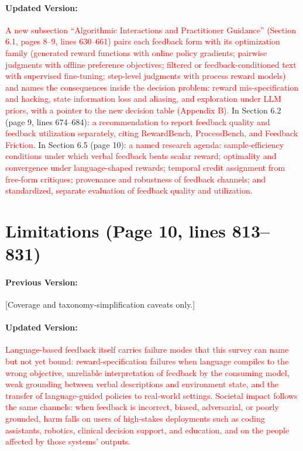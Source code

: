 \documentclass[11pt]{article}
\newcommand{\red}[1]{\textcolor{red}{#1}}
\begin{document}
\paragraph{Updated Version:} \red{A new subsection ``Algorithmic Interactions and Practitioner Guidance'' (Section 6.1, pages 8--9, lines 630--661) pairs each feedback form with its optimization family (generated reward functions with online policy gradients; pairwise judgments with offline preference objectives; filtered or feedback-conditioned text with supervised fine-tuning; step-level judgments with process reward models) and names the consequences inside the decision problem: reward mis-specification and hacking, state information loss and aliasing, and exploration under LLM priors, with a pointer to the new decision table (Appendix B).} In Section 6.2 (page 9, lines 674--684): \red{a recommendation to report feedback quality and feedback utilization separately, citing RewardBench, ProcessBench, and Feedback Friction.} In Section 6.5 (page 10): \red{a named research agenda: sample-efficiency conditions under which verbal feedback beats scalar reward; optimality and convergence under language-shaped rewards; temporal credit assignment from free-form critiques; provenance and robustness of feedback channels; and standardized, separate evaluation of feedback quality and utilization.}

\section{Limitations (Page 10, lines 813--831)}

\paragraph{Previous Version:} [Coverage and taxonomy-simplification caveats only.]

\paragraph{Updated Version:} \red{Language-based feedback itself carries failure modes that this survey can name but not yet bound: reward-specification failures when language compiles to the wrong objective, unreliable interpretation of feedback by the consuming model, weak grounding between verbal descriptions and environment state, and the transfer of language-guided policies to real-world settings. Societal impact follows the same channels: when feedback is incorrect, biased, adversarial, or poorly grounded, harm falls on users of high-stakes deployments such as coding assistants, robotics, clinical decision support, and education, and on the people affected by those systems' outputs.}
\end{document}
